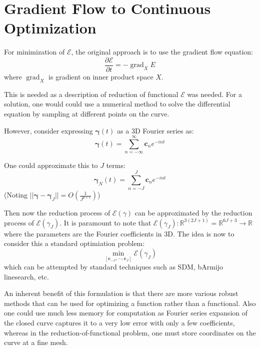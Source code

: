 \documentclass[a4paper]{article}
\newcommand{\norm}[1]{||#1||}
\DeclareMathOperator{\grad}{grad}
\begin{document}
\section{Gradient Flow to Continuous Optimization}
For minimization of $\mathcal{E}$, the original approach is to use the gradient flow equation:
\begin{equation}
    \frac{\partial \mathcal{E}}{\partial t} = - \grad_X {E}
\end{equation}
where $\grad_X$ is gradient on inner product space $X$.

This is needed as a description of reduction of functional $\mathcal{E}$ was needed.
For a solution, one would could use a numerical method to solve the differential equation
by sampling at different points on the curve.

However, consider expressing $\boldsymbol{\gamma}(t)$ as a 3D Fourier series as:
\begin{equation}
    \boldsymbol{\gamma}(t) = \sum_{n=-\infty}^{\infty} \mathbf{c}_n e^{-int}
\end{equation}

One could approximate this to $J$ terms:
\begin{equation}
    \boldsymbol{\gamma}_N (t) = \sum_{n = -J}^{J} \mathbf{c}_n e^{-int}
\end{equation}
(Noting $\norm{\boldsymbol{\gamma} - \boldsymbol{\gamma}_J} = O\left( \frac{1}{J^{p+1}} \right)$)

Then now the reduction process of $\mathcal{E}\left( \gamma \right)$ can be approximated by the reduction process of $\mathcal{E}\left( \gamma_J \right)$.
It is paramount to note that $\mathcal{E} \left( \gamma_J \right): \mathbb{R}^{3\left( 2J + 1 \right)} = \mathbb{R}^{6J + 3} \rightarrow \mathbb{R}$ where the parameters are the Fourier coefficients in 3D.
The idea is now to consider this a standard optimiation problem:
\begin{equation}
    \min_{\left[ \mathbf{c}_{-J}, \cdots, \mathbf{c}_{J} \right]} \mathcal{E} \left( \gamma_J \right)
\end{equation}
which can be attempted by standard techniques such as SDM, bArmijo linesearch, etc.

An inherent benefit of this formulation is that there are more various robust methods that can be used for optimizing a function rather than a functional.
Also one could use much less memory for computation as Fourier series expansion of the closed curve captures it to a very low error with only a few coefficients, whereas in the reduction-of-functional problem, one must store coordinates on the curve at a fine mesh.
\end{document}
